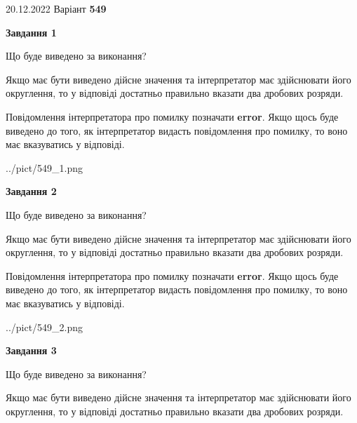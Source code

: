 \documentclass[12pt, ukrainian]{article}
\begin{document}
{20.12.2022 Варіант \No \textbf { 549 }\par}
{
\begin {Large}

{\begin {center}\textbf{Завдання 1}\end {center}}\par
Що буде виведено за виконання? \par

Якщо має бути виведено дійсне значення та інтерпретатор має здійснювати його округлення, 
то у відповіді достатньо правильно вказати два дробових розряди.

Повідомлення інтерпретатора про помилку позначати \textbf{error}.
Якщо щось буде виведено до того, як інтерпретатор видасть повідомлення про помилку, 
то воно має вказуватись у відповіді. \par

\begin{center}
	{../pict/549_1.png}
\end{center}
\newpage

{\begin {center}\textbf{Завдання 2}\end {center}}\par
Що буде виведено за виконання? \par

Якщо має бути виведено дійсне значення та інтерпретатор має здійснювати його округлення, 
то у відповіді достатньо правильно вказати два дробових розряди.

Повідомлення інтерпретатора про помилку позначати \textbf{error}.
Якщо щось буде виведено до того, як інтерпретатор видасть повідомлення про помилку, 
то воно має вказуватись у відповіді. \par

\begin{center}
	{../pict/549_2.png}
\end{center}
\newpage

{\begin {center}\textbf{Завдання 3}\end {center}}\par
Що буде виведено за виконання? \par

Якщо має бути виведено дійсне значення та інтерпретатор має здійснювати його округлення, 
то у відповіді достатньо правильно вказати два дробових розряди.


\end{Large}}
\end{document}
